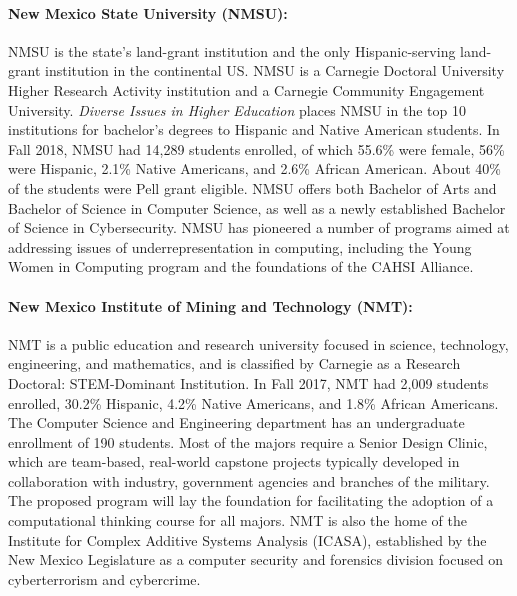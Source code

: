 \paragraph{New Mexico State University (NMSU):}
NMSU is the state's land-grant institution and the only Hispanic-serving land-grant institution in the continental US. %
NMSU is a Carnegie Doctoral University Higher Research Activity institution
and a Carnegie Community Engagement University.
\emph{Diverse Issues in Higher Education} places NMSU
in the top 10 institutions for bachelor’s degrees to Hispanic and Native American students. 
In Fall 2018, NMSU had 14,289 students enrolled, of which 55.6\% were female, 56\% were Hispanic, 2.1\%
Native Americans, and 2.6\% African American. About 40\% of the students were Pell grant eligible.
NMSU offers both Bachelor of Arts and Bachelor of Science in Computer Science, as well as a newly established Bachelor of Science in Cybersecurity.  NMSU has pioneered a number of programs aimed at addressing issues of underrepresentation in computing, including the Young Women in Computing program and the foundations of the CAHSI Alliance.

\paragraph{New Mexico Institute of Mining and Technology (NMT):}
NMT is a public education and research university focused in science, technology, engineering, and mathematics, and is classified by Carnegie as a Research Doctoral: STEM-Dominant Institution. 
In Fall
2017, NMT had 2,009 students enrolled, 30.2\% Hispanic, 4.2\% Native Americans, and 1.8\% African Americans.
The Computer Science and Engineering department has an undergraduate enrollment of 190 students.
Most of the majors require a Senior Design Clinic, which are team-based,
real-world capstone projects typically developed in collaboration with industry, government agencies
and branches of the military. The proposed program will lay the foundation for facilitating the adoption of a computational thinking course for all majors. NMT is also the home of the Institute for Complex Additive Systems Analysis (ICASA), established by the New Mexico Legislature as a computer security and forensics division focused on cyberterrorism and cybercrime.



